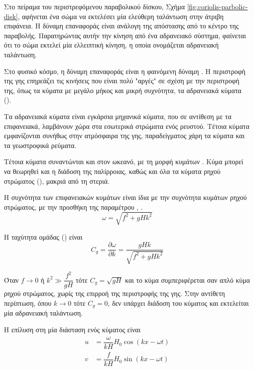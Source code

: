 Στο πείραμα του περιστρεφόμενου παραβολικού δίσκου, Σχήμα \ref{fig:coriolis-parbolic-disk}, αφήνεται ένα σώμα να εκτελέσει μία ελεύθερη ταλάντωση στην άτριβη επιφάνεια. Η δύναμη επαναφοράς είναι ανάλογη της απόστασης από το κέντρο της παραβολής. Παρατηρώντας αυτήν την κίνηση από ένα αδρανειακό σύστημα, φαίνεται ότι το σώμα εκτελεί μία ελλειπτική κίνηση, η οποία ονομάζεται αδρανειακή ταλάντωση.

Στο φυσικό κόσμο, η δύναμη επαναφοράς είναι η φαινόμενη δύναμη . Η περιστροφή της γης επηρεάζει τις κινήσεις που είναι πολύ "αργές" σε σχέση με την περιστροφή της, όπως τα κύματα με μεγάλο μήκος και μικρή συχνότητα, τα αδρανειακά κύματα ().

Τα αδρανειακά κύματα είναι εγκάρσια μηχανικά κύματα, που σε αντίθεση με τα επιφανειακά, λαμβάνουν χώρα στα εσωτερικά στρώματα ενός ρευστού. Τέτοια κύματα εμφανίζονται συνήθως στην ατμόσφαιρα της γης, παραδείγματος χάρη τα κύματα  και τα γεωστροφικά ρεύματα.

Τέτοια κύματα συναντώνται και στον ωκεανό, με τη μορφή κυμάτων . Κύμα  μπορεί να θεωρηθεί και η διάδοση της παλίρροιας, καθώς και όλα τα κύματα ρηχού στρώματος (), μακριά από τη στεριά.

Η συχνότητα των επιφανειακών κυμάτων  είναι ίδια με την συχνότητα κυμάτων ρηχού στρώματος, με την προσθήκη της παραμέτρου , .
\begin{equation}
	ω = \sqrt{f^2+gHk^2}
\end{equation}

Η ταχύτητα ομάδας () είναι
\begin{equation}
	C_g = \dfrac{\partial{ω}}{\partial{k}} = \dfrac{gHk}{\sqrt{f^2+gHk^2}}
\end{equation}

Όταν $f \rightarrow 0$ ή $k^2 \gg \dfrac{f^2}{gH}$ τότε $C_g=\sqrt{gH}$ και το κύμα συμπεριφέρεται σαν απλό κύμα ρηχού στρώματος, χωρίς της επιρροή της περιστροφής της γης. Στην αντίθετη περίπτωση, όπου $k \rightarrow 0$ τότε $C_g = 0$, δεν υπάρχει διάδοση του κύματος και εκτελείται μία αδρανειακή ταλάντωση.

Η επίλυση στη μία διάσταση ενός κύματος  είναι
\begin{align}
	u &= \dfrac{ω}{kH}H_0\cos(kx-ωt) \\
	v &= \dfrac{f}{kH}H_0\sin(kx-ωt)
\end{align}

